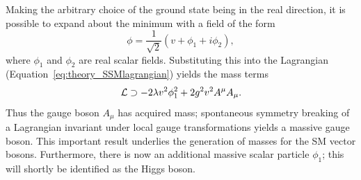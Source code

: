Making the arbitrary choice of the ground state being in the real direction, 
it is possible to expand about the minimum with a field of the form
\begin{equation}
\phi = \frac{1}{\sqrt{2}} (v + \phi_1 + i\phi_2) ,
\end{equation}
where $\phi_1$ and $\phi_2$ are real scalar fields.
Substituting this into the Lagrangian (Equation~\ref{eq:theory_SSMlagrangian}) yields the mass terms
\begin{equation}
\mathcal{L} \supset - 2 \lambda v^2 \phi^2_1 + 2 g^2 v^2 A^\mu A_\mu .
\end{equation}
Thus the gauge boson $A_\mu$ has acquired mass;
spontaneous symmetry breaking of a Lagrangian invariant under local gauge transformations 
yields a massive gauge boson. 
This important result underlies the generation of masses for the SM vector bosons.
Furthermore, there is now an additional massive scalar particle $\phi_1$;
this will shortly be identified as the Higgs boson.

